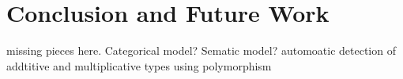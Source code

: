 \chapter{Conclusion and Future Work}

missing pieces here.
Categorical model?
Sematic model?
automoatic detection of  addtitive and multiplicative types using polymorphism